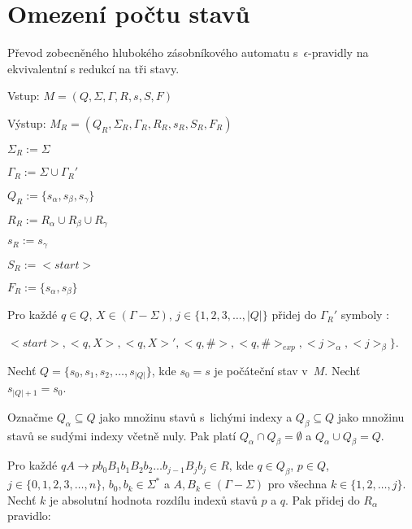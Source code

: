 \section{Omezení počtu stavů}


\begin{Alg}
Převod zobecněného hlubokého zásobníkového automatu s~$\epsilon$-pravidly na ekvivalentní s redukcí na tři stavy.

\begin{list}{}{\setlength\parsep{0cm} \setlength\itemsep{0cm} \setlength\leftmargin{1em}}
   \item Vstup: $M = (Q,\Sigma,\Gamma, R, s, S, F)$ 
   \item Výstup: $M_{R} = (Q_{R}, \Sigma_{R}, {\Gamma}_{R}, R_{R}, s_{R},  S_{R}, F_{R})$ \medskip
    
   \item ${\Sigma}_{R} := \Sigma$
   \item ${\Gamma}_{R} := \Sigma \cup {\Gamma}_{R}'$
   \item $Q_{R} := \{s_\alpha, s_\beta, s_\gamma \}$
   \item $R_{R} := R_{\alpha} \cup R_{\beta} \cup R_{\gamma}$
   \item $s_{R} := s_{\gamma} $
   \item $S_{R} := <start> $
   \item $F_{R} := \{s_{\alpha}, s_{\beta}\} $ \medskip

   \item Pro každé $q \in Q$, $X \in (\Gamma - \Sigma)$, $j \in \{1,2,3,\dots,|Q|\}$ přidej do ${\Gamma}_{R}'$ symboly :
   \item $<start>, <q, X>, <q, X>', <q, \#>, <q, \#>_{exp}, <j>_\alpha, <j>_\beta \}$.\medskip

   \item Nechť $Q = \{s_0, s_1, s_2, \dots,s_{|Q|}\}$, kde $s_0 = s$ je počáteční stav v~$M$. Nechť $s_{|Q|+1} = s_0$.
   \item Označme $Q_\alpha \subseteq Q$ jako množinu stavů s~lichými indexy a $Q_\beta \subseteq Q$ jako množinu stavů se sudými indexy včetně nuly.
         Pak platí $Q_\alpha \cap Q_\beta = \emptyset$ a  $Q_\alpha \cup Q_\beta = Q$.\medskip

   \item Pro každé $qA \rightarrow p b_0 B_1 b_1 B_2 b_2 \dots b_{j-1} B_{j} b_j \in R$, kde $q \in Q_\beta$, $p \in Q$, $j \in \{0,1,2,3,\dots,n\}$, $b_0,b_k \in {\Sigma}^*$ a $A, B_k \in (\Gamma - \Sigma)$ pro všechna $k \in \{1,2,\dots,j\}$. 
         Nechť $k$ je absolutní hodnota rozdílu indexů stavů $p$ a $q$. 
         Pak přidej do $R_\alpha$ pravidlo:



\end{list}
\end{Alg}
